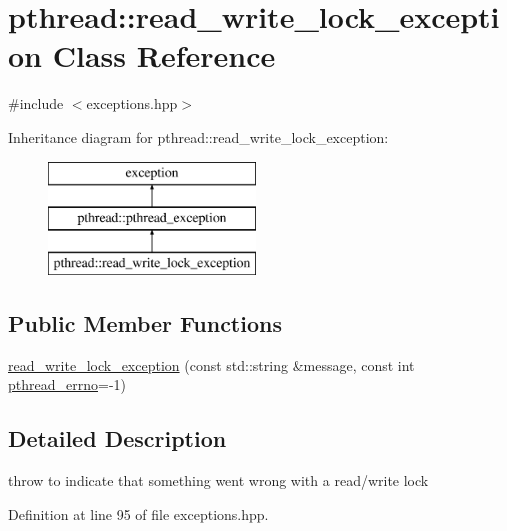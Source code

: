 \hypertarget{classpthread_1_1read__write__lock__exception}{\section{pthread\+:\+:read\+\_\+write\+\_\+lock\+\_\+exception Class Reference}
\label{classpthread_1_1read__write__lock__exception}
}


{\ttfamily \#include $<$exceptions.\+hpp$>$}

Inheritance diagram for pthread\+:\+:read\+\_\+write\+\_\+lock\+\_\+exception\+:\begin{figure}[H]
\begin{center}
\leavevmode
\includegraphics[height=3.000000cm]{classpthread_1_1read__write__lock__exception}
\end{center}
\end{figure}
\subsection*{Public Member Functions}
\begin{DoxyCompactItemize}
\item 
\hyperlink{classpthread_1_1read__write__lock__exception_a62da10d4753dffbec177b68cdbf6df65}{read\+\_\+write\+\_\+lock\+\_\+exception} (const std\+::string \&message, const int \hyperlink{classpthread_1_1pthread__exception_a4a869173054faca1945ac1a7729082d6}{pthread\+\_\+errno}=-\/1)
\end{DoxyCompactItemize}


\subsection{Detailed Description}
throw to indicate that something went wrong with a read/write lock 

Definition at line 95 of file exceptions.\+hpp.



